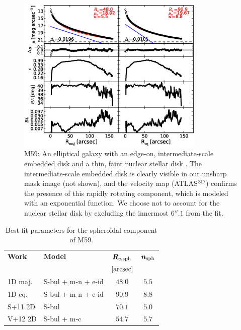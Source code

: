 \documentclass[preprint2]{emulateapj}
\newcommand{\fitfigurewidth}{0.8\textwidth}
\begin{document}
  \begin{figure}[h]
  \begin{center}
  \includegraphics[width=\fitfigurewidth]{m59_1Dfit.eps}
  \caption{M59:
  An elliptical galaxy with an edge-on, intermediate-scale embedded disk \citep{scorzabender1995}
  and a thin, faint nuclear stellar disk \citep{ferrarese2006acsvcs,ledo2010}. 
  The intermediate-scale embedded disk is clearly visible in our unsharp mask image (not shown), and 
  the velocity map (ATLAS$^{\rm 3D}$) confirms the presence of this rapidly rotating component, which is modeled with an exponential function.
  We choose not to account for the nuclear stellar disk by excluding the innermost $6''.1$ from the fit.  
  }
  \end{center}
  \end{figure}

  \begin{table}[h]
  \small
  \caption{Best-fit parameters for the spheroidal component of M59.}
  \begin{center}
  \begin{tabular}{llcc}
  \hline
  {\bf Work} & {\bf Model}   & $\bm R_{\rm e,sph}$    & $\bm n_{\rm sph}$ \\
    &  &  $[\rm arcsec]$ & \\
  \hline
  1D maj. & S-bul + m-n + e-id & $48.0$  &  $5.5$ \\
  1D eq.  & S-bul + m-n + e-id & $90.9$  &  $8.8$ \\
  \hline 
  S+11 2D         & S-bul       & $70.1$  &  $5.0$ \\
  V+12 2D         & S-bul + m-c & $54.7$  &  $5.7$ \\
  \hline
  \end{tabular}
  \end{center}
  \label{tab:m59}
  \end{table}
\end{document}
